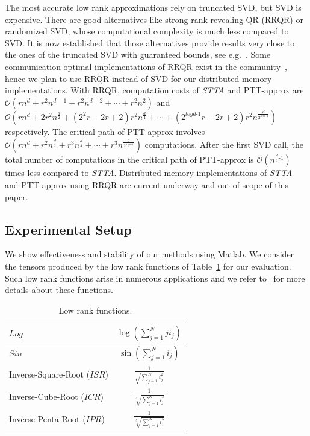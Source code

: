 \documentclass[runningheads]{llncs}
\newcommand{\otta}{{\it STTA}\xspace}
\begin{document}
The most accurate low rank approximations rely on truncated SVD, but SVD is expensive. There are good alternatives like strong rank revealing QR (RRQR) or randomized SVD, whose computational complexity is much less compared to SVD. It is now established that those alternatives provide results very close to the ones of the truncated SVD with guaranteed bounds, see e.g.~\cite{demmel19:_improv_analy_and_unified_persp}. Some communication optimal implementations of RRQR exist in the community~\cite{beaupere-tournamentpivoting}, hence we plan to use RRQR instead of SVD for our distributed memory implementations. With RRQR, computation costs of \otta and PTT-approx are $\mathcal{O}(rn^d+r^2n^{d-1} + r^2n^{d-2} +\cdots + r^2n^2)$ and $\mathcal{O}(rn^d + 2r^2n^{\frac{d}{2}} + (2^2r-2r+2)r^2n^{\frac{d}{4}}+\cdots+ (2^{log{}d\text{-}1}r -2r+2)r^2n^{\frac{d}{2^{log{}d\text{-}1}}})$ respectively. The critical path of PTT-approx involves $\mathcal{O}(rn^d + r^2n^{\frac{d}{2}} + r^3n^{\frac{d}{4}} +\cdots+ r^3n^{\frac{d}{2^{log{}d\text{-}1}}})$ computations. After the first SVD call, the total number of computations in the critical path of PTT-approx is $\mathcal{O}(n^{\frac{d}{2}\text{-1}})$ times less compared to \otta. Distributed memory implementations of \otta and PTT-approx using RRQR are current underway and out of scope of this paper.

\subsection{Experimental Setup}
We show effectiveness and stability of our methods using Matlab.  
We consider the tensors produced by the low rank functions of Table~\ref{tab:lowRankFunctions} for our evaluation. Such low rank functions arise in numerous applications and we refer to~\cite{lowRankFunctions,lowRankFunction-BM-2005,lowRankFunction-HKT-2005} for more details about these functions.

\begin{table}[htb]
	\centering
	\begin{tabular}{|l|c|}
		\hline
		$Log$ & $\log(\sum_{j=1}^{N}j i_j)$\\ \hline
		$Sin$ & $\sin(\sum_{j=1}^{N}i_j)$\\ \hline
		Inverse-Square-Root ($ISR$) & $\frac{1}{\sqrt{\sum_{j=1}^{N}i_j^2}}$\\ \hline
		Inverse-Cube-Root ($ICR$) & $\frac{1}{\sqrt[3]{\sum_{j=1}^{N}i_j^3}}$\\ \hline
		Inverse-Penta-Root ($IPR$) & $\frac{1}{\sqrt[5]{\sum_{j=1}^{N}i_j^5}}$\\ \hline
	\end{tabular}
	\caption{Low rank functions.\label{tab:lowRankFunctions}\vspace*{-0.35cm}}
\end{table}
\end{document}

